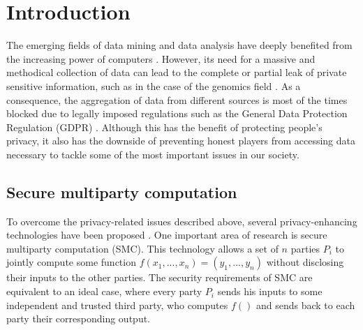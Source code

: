


%

\chapter{Introduction}

The emerging fields of data mining and data analysis have deeply benefited from the increasing power of computers \cite{Wang11}. However, its need for a massive and methodical collection of data can lead to the complete or partial leak of private sensitive information, such as in the case of the genomics field \cite{NS08, L02, Homer08, Gymrek13}. As a consequence, the aggregation of data from different sources is most of the times blocked due to legally imposed regulations such as the General Data Protection Regulation (GDPR) \cite{EUdataregulations2016}. Although this has the benefit of protecting people's privacy, it also has the downside of preventing honest players from accessing data necessary to tackle some of the most important issues in our society. 

\section*{Secure multiparty computation}


To overcome the privacy-related issues described above, several privacy-enhancing technologies have been proposed \cite{Li2016, Armknecht2015, Yao82}. One important area of research is secure multiparty computation (SMC). This technology allows a set of $n$ parties $P_i$ to jointly compute some function $f( x_1, ..., x_n ) = (y_1, ..., y_n)$ without disclosing their inputs to the other parties. The security requirements of SMC are equivalent to an ideal case, where every party $P_i$ sends his inputs to some independent and trusted third party, who computes $f()$ and sends back to each party their corresponding output.

